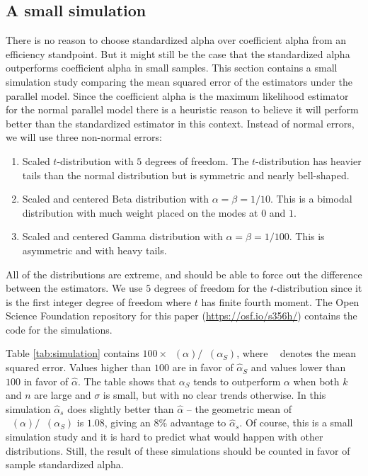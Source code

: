\documentclass[twoside]{article}
\DeclareMathOperator{\MSE}{MSE_Z}
\begin{document}
\subsection{A small simulation}
There is no reason to choose standardized alpha over coefficient alpha from an efficiency standpoint. But it might still be the case
that the standardized alpha outperforms coefficient alpha
in small samples. This section contains a small simulation
study comparing the mean squared error of the estimators under
the parallel model. Since the coefficient alpha is the maximum likelihood
estimator for the normal parallel model there is a heuristic reason
to believe it will perform better than the standardized estimator
in this context. Instead of normal errors, we will use three non-normal
errors:

\begin{enumerate}
\item Scaled $t$-distribution with $5$ degrees of freedom. The $t$-distribution
has heavier tails than the normal distribution but is symmetric and nearly bell-shaped. 
\item Scaled and centered Beta distribution with $\alpha=\beta=1/10$. This is a bimodal distribution with much weight placed on the modes at $0$ and $1$. 
\item Scaled and centered Gamma distribution with $\alpha=\beta=1/100$. This is asymmetric and with heavy tails. 
\end{enumerate}

All of the distributions are extreme, and should be able to force out the difference between the estimators. We use $5$ degrees of freedom for the $t$-distribution since it is the first integer degree of freedom where $t$ has finite fourth moment. The Open Science Foundation repository for this paper (\url{https://osf.io/s356h/}) contains the code for the simulations.



Table \ref{tab:simulation} contains $100 \times \MSE(\alpha)/\MSE(\alpha_S)$, where $\MSE$ denotes the mean squared error. Values higher than $100$ are in favor of $\hat{\alpha}_S$ and values lower than $100$ in favor of $\hat{\alpha}$. The table shows that $\alpha_S$ tends to outperform $\alpha$ when both $k$ and $n$ are large and $\sigma$ is small, but with no clear trends otherwise. In this simulation $\hat{\alpha}_s$ does slightly better than $\hat{\alpha}$ -- the geometric mean of $\MSE(\alpha)/\MSE({\alpha_S})$ is $1.08$, giving an $8$\% advantage to $\hat{\alpha}_s$. Of course, this is a small simulation study and it is hard to predict what would happen with other distributions. Still, the result of these simulations should be counted in favor of sample standardized alpha.
\end{document}
